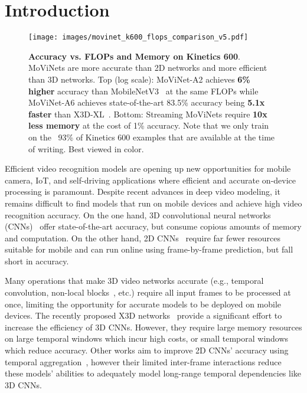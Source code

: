 \documentclass[final]{cvpr}
\newcommand{\ournet}{MoViNet\xspace} \newcommand{\ournets}{\ournet{}s\xspace}
\begin{document}
\section{Introduction} \label{sec:intro}
\begin{figure}[t]
    \begin{center}
    \texttt{[image: images/movinet\_k600\_flops\_comparison\_v5.pdf]}
    \end{center}
        \vspace{-5pt}
        \caption{
            {\bf Accuracy vs. FLOPs and Memory on Kinetics 600}.
            \ournets are more accurate than 2D networks and more efficient than 3D networks.
            Top (log scale): \ournet-A2 achieves {\bf 6\% higher} accuracy than MobileNetV3~\cite{howard2019searching} at the same FLOPs while \ournet-A6 achieves state-of-the-art 83.5\% accuracy being {\bf 5.1x faster} than X3D-XL~\cite{feichtenhofer2020x3d}.
            Bottom: Streaming \ournets require {\bf 10x less memory} at the cost of 1\% accuracy.
            Note that we only train on the ~93\% of Kinetics 600 examples that are available at the time of writing.
            Best viewed in color.
        }
        \vspace{-12pt}
    \label{fig:k600-comparison}
\end{figure}

Efficient video recognition models are opening up new opportunities for mobile camera, IoT, and self-driving applications where efficient and accurate on-device processing is paramount.
Despite recent advances in deep video modeling, it remains difficult to find models that run on mobile devices and achieve high video recognition accuracy.
On the one hand, 3D convolutional neural networks (CNNs)~\cite{tran2018closer, wang2018non, feichtenhofer2019slowfast, feichtenhofer2020x3d, ryoo2019assemblenet} offer state-of-the-art accuracy, but consume copious amounts of memory and computation.
On the other hand, 2D CNNs~\cite{lin2019tsm, zhu2020faster} require far fewer resources suitable for mobile and can run online using frame-by-frame prediction, but fall short in accuracy.

Many operations that make 3D video networks accurate (e.g., temporal convolution, non-local blocks~\cite{wang2018non}, etc.) require all input frames to be processed at once, limiting the opportunity for accurate models to be deployed on mobile devices.
The recently proposed X3D networks~\cite{feichtenhofer2020x3d} provide a significant effort to increase the efficiency of 3D CNNs.
However, they require large memory resources on large temporal windows which incur high costs, or small temporal windows which reduce accuracy.
Other works aim to improve 2D CNNs' accuracy using temporal aggregation~\cite{lin2019tsm, fan2019more, wu2020dynamic, liu2020tam, fan2020rubiksnet}, however their limited inter-frame interactions reduce these models' abilities to adequately model long-range temporal dependencies like 3D CNNs.
\end{document}
